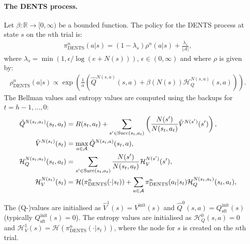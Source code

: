 \documentclass{article}
\newcommand{\bb}[1]{\mathbb{#1}}
\newcommand{\cl}[1]{\mathcal{#1}}
\newcommand{\Vt}[2]{\hat{V}^{#2}(#1)}
\newcommand{\Qt}[3]{\hat{Q}^{#3}(#1,#2)}
\newcommand{\succc}[2]{\textnormal{Succ}(#1,#2)}
\theoremstyle{plain}
\begin{document}
\begin{appendices}
        \paragraph{The DENTS process.}
        Let $\beta : \bb{R}\rightarrow [0,\infty)$ be a bounded function. The policy for the DENTS process at state $s$ on the $n$th trial is:
        \begin{align}
            \pi^{n}_{\text{DENTS}}(a|s) = (1-\lambda_s)\rho^n(a|s) + \frac{\lambda_s}{|\cl{A}|}, \label{appeq:dents_search_policy} 
        \end{align}
        where $\lambda_s=\min(1,\epsilon/\log(e+N(s)))$, $\epsilon \in (0,\infty)$ and where $\rho$ is given by:
        \begin{align}
            \rho^n_{\text{DENTS}}(a|s) \propto \exp\left(\frac{1}{\alpha}\left(\Qt{s}{a}{N(s,a)} + \beta(N(s))\cl{H}_Q^{N(s,a)}(s,a) \right)\right).
        \end{align}
        The Bellman values and entropy values are computed using the backups for $t=h-1,...,0$:
        \begin{align}
            \Qt{s_t}{a_t}{N(s_t,a_t)} &= R(s_t,a_t) + \sum_{s' \in \succc{s_t}{a_t}} \left( \frac{N(s')}{N(s_t,a_t)} \Vt{s'}{N(s')} \right), \label{appeq:dp_q_backup} \\ 
            \Vt{s_t}{N(s_t)} &=\max_{a\in\cl{A}} \Qt{s_t}{a}{N(s_t,a)}, \label{appeq:dp_v_backup} \\
            \cl{H}_Q^{N(s_t,a_t)}(s_t,a_t) &= \sum_{s'\in \succc{s_t}{a_t}} \frac{N(s')}{N(s_t,a_t)} \cl{H}_V^{N(s')}(s'), \\
            \cl{H}_V^{N(s_t)}(s_t) &= \cl{H}(\pi^n_{\text{DENTS}}(\cdot | s_t)) + \sum_{a\in\cl{A}} \pi^n_{\text{DENTS}}(a_t|s_t)\cl{H}_Q^{N(s_t,a_t)}(s_t,a_t), 
        \end{align}
        
        The (Q-)values are initialised as $\Vt{s}{1}=V^{\text{init}}(s)$ and $\Qt{s}{a}{0}=Q^{\text{init}}_{\text{sft}}(s)$ (typically $Q^{\text{init}}_{\text{sft}}(s)=0$). The entropy values are initialised as $\cl{H}_Q^{0}(s,a)=0$ and $\cl{H}_V^{1}(s) = \cl{H}(\pi^n_{\text{DENTS}}(\cdot | s_t))$, where the node for $s$ is created on the $n$th trial.


\end{appendices}
\end{document}
